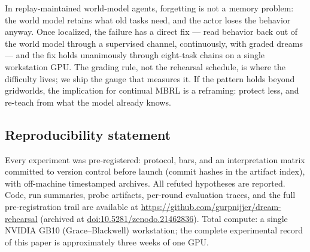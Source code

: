 \documentclass[10pt]{article}
\begin{document}
In replay-maintained world-model agents, forgetting is not a memory problem: the world model
retains what old tasks need, and the actor loses the behavior anyway. Once localized, the
failure has a direct fix --- read behavior back out of the world model through a supervised
channel, continuously, with graded dreams --- and the fix holds unanimously through
eight-task chains on a single workstation GPU. The grading rule, not the rehearsal schedule,
is where the difficulty lives; we ship the gauge that measures it. If the pattern holds
beyond gridworlds, the implication for continual MBRL is a reframing: protect less, and
re-teach from what the model already knows.

\subsection*{Reproducibility statement}
Every experiment was pre-registered: protocol, bars, and an interpretation matrix committed
to version control before launch (commit hashes in the artifact index), with off-machine
timestamped archives. All refuted hypotheses are reported. Code, run summaries, probe
artifacts, per-round evaluation traces, and the full pre-registration trail are available at
\url{https://github.com/gurpnijjer/dream-rehearsal} (archived at
\href{https://doi.org/10.5281/zenodo.21462836}{doi:10.5281/zenodo.21462836}). Total compute:
a single NVIDIA GB10 (Grace--Blackwell) workstation; the complete experimental record of this paper is
approximately three weeks of one GPU.
\end{document}
